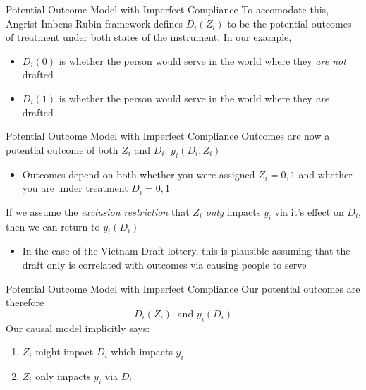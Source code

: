 \documentclass[aspectratio=169,t,11pt,table]{beamer}
\begin{document}
\begin{frame}{Potential Outcome Model with Imperfect Compliance}
  To accomodate this, Angrist-Imbens-Rubin framework defines $D_i(Z_i)$ to be the potential outcomes of treatment under both states of the instrument. In our example,
  \begin{itemize}
    \item $D_i(0)$ is whether the person would serve in the world where they \emph{are not} drafted
    \item $D_i(1)$ is whether the person would serve in the world where they \emph{are} drafted
  \end{itemize}
\end{frame}

\begin{frame}{Potential Outcome Model with Imperfect Compliance}
  Outcomes are now a potential outcome of both $Z_i$ and $D_i$: $y_i(D_i, Z_i)$
  \begin{itemize}
    \item Outcomes depend on both whether you were assigned $Z_i = 0, 1$ and whether you are under treatment $D_i = 0, 1$
  \end{itemize}

  \pause
  \bigskip
  If we assume the \emph{exclusion restriction} that $Z_i$ \emph{only} impacts $y_i$ via it's effect on $D_i$, then we can return to $y_i(D_i)$
  \pause
  \begin{itemize}
    \item In the case of the Vietnam Draft lottery, this is plausible assuming that the draft only is correlated with outcomes via causing people to serve
  \end{itemize}
\end{frame}

\begin{frame}{Potential Outcome Model with Imperfect Compliance}
  Our potential outcomes are therefore
  $$
    D_i(Z_i) \ \text{ and } y_i(D_i)
  $$
  Our causal model implicitly says:
  \begin{enumerate}
    \item $Z_i$ might impact $D_i$ which impacts $y_i$
    \item $Z_i$ only impacts $y_i$ via $D_i$
  \end{enumerate}
\end{frame}
\end{document}
